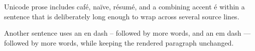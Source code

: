 \documentclass{article}
\begin{document}
Unicode prose includes café, naïve, résumé, and a combining accent é within a sentence that is deliberately long enough to wrap across several source lines.

Another sentence uses an en dash – followed by more words, and an em dash — followed by more words, while keeping the rendered paragraph unchanged.
\end{document}
